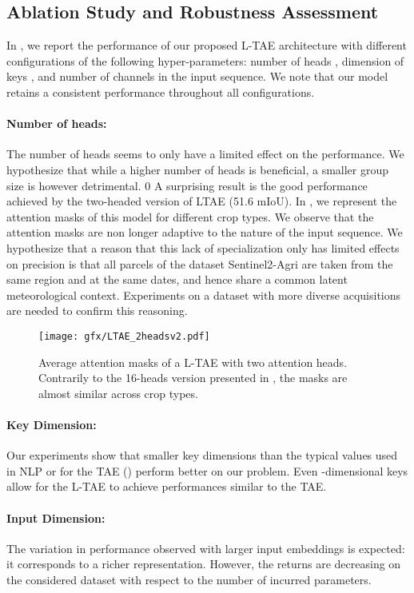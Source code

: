 \documentclass[runningheads]{llncs}
\begin{document}
\subsection{Ablation Study and Robustness Assessment}
In , we report the performance of our proposed L-TAE architecture with different configurations of the following hyper-parameters: number of heads , dimension of keys , and number of channels  in the input sequence. We note that our model retains a consistent performance throughout all configurations.\paragraph{Number of heads:} 
The number of heads seems to only have a limited effect on the performance. We hypothesize that while a higher number of heads  is beneficial, a smaller group size  is however detrimental. 
 0
A surprising result is the good performance achieved by the two-headed version of LTAE (51.6 mIoU). 
In , we represent the attention masks of this model for different crop types. We observe that the attention masks are non longer adaptive to the nature of the input sequence. 
We hypothesize that a reason that this lack of specialization only has limited effects on precision is that all parcels of the dataset Sentinel2-Agri are taken from the same region and at the same dates, and hence share a common latent meteorological context. Experiments on a  dataset with more diverse acquisitions are needed to confirm this reasoning.
\begin{figure}
    \centering
    \texttt{[image: gfx/LTAE\_2headsv2.pdf]}
    \caption{Average attention masks of a L-TAE with two attention heads.
    Contrarily to the 16-heads version presented in , the  masks are almost similar across crop types.
}
    \label{fig:2heads}
\end{figure}
\fi
\paragraph{Key Dimension:} Our experiments show that smaller key dimensions than the typical values used in NLP or for the TAE () perform better on our problem. Even -dimensional keys allow for the L-TAE to achieve performances similar to the TAE.

\paragraph{Input Dimension:} The variation in performance observed with larger input embeddings is expected: it corresponds to a richer representation. However, the returns are decreasing on the considered dataset with respect to the number of incurred parameters.
\end{document}
